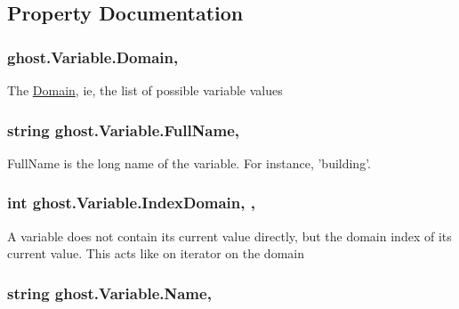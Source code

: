 \subsection{Property Documentation}
\hypertarget{classghost_1_1Variable_aae96e8a30ff2f44dc115a0b51e136e92}{
\subsubsection[{Domain}]{ ghost.\-Variable.\-Domain\hspace{0.3cm}{\ttfamily [get]}, {\ttfamily [set]}}}\label{classghost_1_1Variable_aae96e8a30ff2f44dc115a0b51e136e92}
The \hyperlink{classghost_1_1Domain}{Domain}, ie, the list of possible variable values \hypertarget{classghost_1_1Variable_af20c2f01306cba69f36d32babb703c1d}{
\subsubsection[{Full\-Name}]{\setlength{\rightskip}{0pt plus 5cm}string ghost.\-Variable.\-Full\-Name\hspace{0.3cm}{\ttfamily [get]}, {\ttfamily [set]}}}\label{classghost_1_1Variable_af20c2f01306cba69f36d32babb703c1d}
Full\-Name is the long name of the variable. For instance, 'building'. \hypertarget{classghost_1_1Variable_a4fa08b5d46a4559d345d4752e7a790d2}{
\subsubsection[{Index\-Domain}]{\setlength{\rightskip}{0pt plus 5cm}int ghost.\-Variable.\-Index\-Domain\hspace{0.3cm}{\ttfamily [get]}, {\ttfamily [set]}, {\ttfamily [protected]}}}\label{classghost_1_1Variable_a4fa08b5d46a4559d345d4752e7a790d2}
A variable does not contain its current value directly, but the domain index of its current value. This acts like on iterator on the domain \hypertarget{classghost_1_1Variable_a1dba3848c7675d086eecad078178e4d9}{
\subsubsection[{Name}]{\setlength{\rightskip}{0pt plus 5cm}string ghost.\-Variable.\-Name\hspace{0.3cm}{\ttfamily [get]}, {\ttfamily [set]}}}\label{classghost_1_1Variable_a1dba3848c7675d086eecad078178e4d9}
